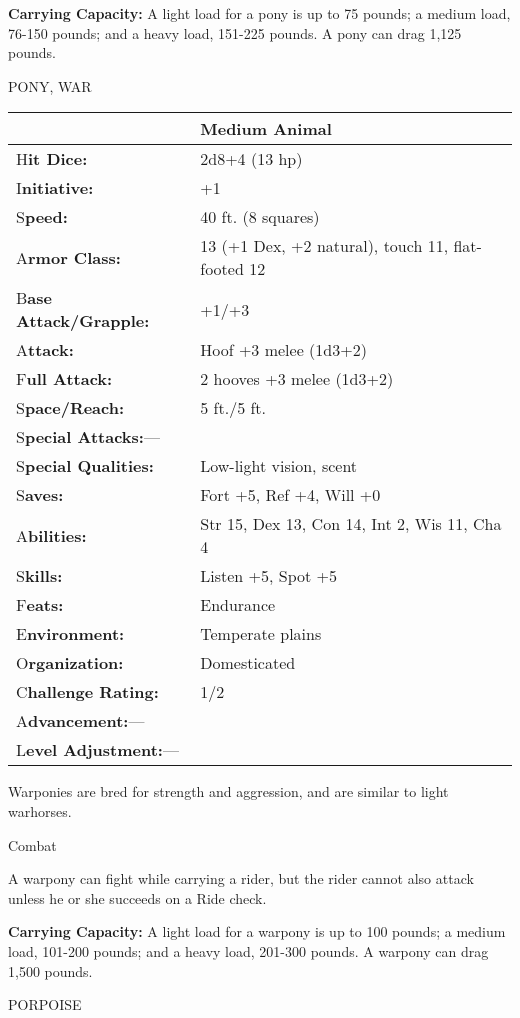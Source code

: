 \documentclass{article}
\begin{document}
\textbf{Carrying Capacity: }A light load for a pony is up to 75 pounds; a medium 
load, 76-150 pounds; and a heavy load, 151-225 pounds. A pony can drag 1,125 pounds.

\vspace{12pt}
PONY, WAR

\begin{tabular}{|>{\raggedright}p{91pt}|>{\raggedright}p{193pt}|}
\hline
  & Medium Animal\tabularnewline
\hline
H\textbf{it Dice:} & 2d8+4 (13 hp)\tabularnewline
\hline
I\textbf{nitiative:} & +1\tabularnewline
\hline
S\textbf{peed:} & 40 ft. (8 squares)\tabularnewline
\hline
A\textbf{rmor Class:} & 13 (+1 Dex, +2 natural), touch 11, flat-footed 12\tabularnewline
\hline
B\textbf{ase Attack/Grapple:} & +1/+3\tabularnewline
\hline
A\textbf{ttack:} & Hoof +3 melee (1d3+2)\tabularnewline
\hline
F\textbf{ull Attack:} & 2 hooves +3 melee (1d3+2)\tabularnewline
\hline
S\textbf{pace/Reach:} & 5 ft./5 ft.\tabularnewline
\hline
S\textbf{pecial Attacks:}--- & \tabularnewline
\hline
S\textbf{pecial Qualities:} & Low-light vision, scent\tabularnewline
\hline
S\textbf{aves:} & Fort +5, Ref +4, Will +0\tabularnewline
\hline
A\textbf{bilities:} & Str 15, Dex 13, Con 14, Int 2, Wis 11, Cha 4\tabularnewline
\hline
S\textbf{kills:} & Listen +5, Spot +5\tabularnewline
\hline
F\textbf{eats:} & Endurance\tabularnewline
\hline
E\textbf{nvironment:} & Temperate plains\tabularnewline
\hline
O\textbf{rganization:} & Domesticated\tabularnewline
\hline
C\textbf{hallenge Rating:} & 1/2\tabularnewline
\hline
A\textbf{dvancement:}--- & \tabularnewline
\hline
L\textbf{evel Adjustment:}--- & \tabularnewline
\hline
\end{tabular}

Warponies are bred for strength and aggression, and are similar to light warhorses.

Combat

A warpony can fight while carrying a rider, but the rider cannot also attack unless 
he or she succeeds on a Ride check.

\textbf{Carrying Capacity: }A light load for a warpony is up to 100 pounds; a medium 
load, 101-200 pounds; and a heavy load, 201-300 pounds. A warpony can drag 1,500 
pounds.

\vspace{12pt}
PORPOISE
\end{document}
